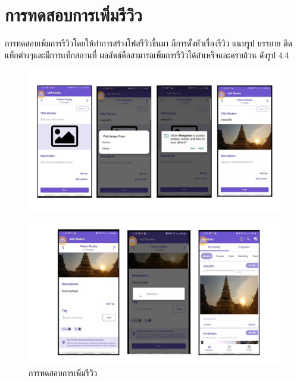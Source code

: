 \section{การทดสอบการเพิ่มรีวิว}
    การทดสอบเพิ่มการรีวิวโดยให้ทำการสร้างโฟสรีวิวขึ้นมา มีการตั้งหัวเรื่องรีวิว แนบรูป บรรยาย ติดแท็กต่างๆและมีการเเท็กสถานที่
ผลลัพธ์คือสามารถเพิ่มการรีวิวได้สำเหร็จและครบถ้วน ดังรูป 4.4
\begin{figure}
    \begin{center}
      \includegraphics[width=1\textwidth]{./image/testing/Slide4.JPG}
    \end{center}
    \end{figure}

    \begin{figure}
        \begin{center}
          \includegraphics[width=1\textwidth]{./image/testing/Slide5.JPG}
        \end{center}
        \caption[การทดสอบการเพิ่มรีวิว]{การทดสอบการเพิ่มรีวิว}
        \end{figure}

